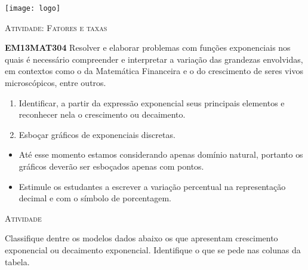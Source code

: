 \documentclass[10 pt,usenames,dvipsnames, oneside]{article}
\begin{document}
\begin{center}
  \begin{minipage}[l]{3cm}
\texttt{[image: logo]}    
\end{minipage}\hfill
\begin{minipage}[r]{.8\textwidth}
 {\Large \scshape Atividade: Fatores e taxas}  
\end{minipage}
\end{center}
\vspace{.2cm}

\ifdefined\prof
\begin{objetivos}
\item \textbf{EM13MAT304} Resolver e elaborar problemas com funções exponenciais nos quais é necessário compreender e interpretar a variação das grandezas envolvidas, em contextos como o da Matemática Financeira e o do crescimento de seres vivos microscópicos, entre outros. 
\end{objetivos}

\begin{goals}
\begin{enumerate}
\item Identificar, a partir da expressão exponencial seus principais elementos e reconhecer nela o crescimento ou decaimento.

\item Esboçar gráficos de exponenciais discretas.
\end{enumerate}

\tcblower

\begin{itemize}
\item Até esse momento estamos considerando apenas domínio natural, portanto os gráficos deverão ser esboçados apenas com pontos.

\item Estimule os estudantes a escrever a variação percentual na representação decimal e com o símbolo de porcentagem.
\end{itemize}
\end{goals}

\bigskip
\begin{center}
{\large \scshape Atividade}
\end{center}
\fi

Classifique dentre os modelos dados abaixo os que apresentam crescimento exponencial ou decaimento exponencial. Identifique o que se pede nas colunas da tabela.
\end{document}
